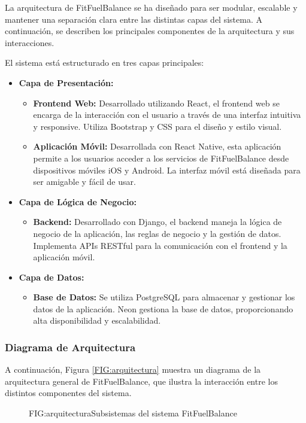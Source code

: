 La arquitectura de FitFuelBalance se ha diseñado para ser modular, escalable y mantener una separación clara entre las distintas capas del sistema. A continuación, se describen los principales componentes de la arquitectura y sus interacciones.

El sistema está estructurado en tres capas principales: 

\begin{itemize}
    \item \textbf{Capa de Presentación:} 
    \begin{itemize}
        \item \textbf{Frontend Web:} Desarrollado utilizando React, el frontend web se encarga de la interacción con el usuario a través de una interfaz intuitiva y responsive. Utiliza Bootstrap y CSS para el diseño y estilo visual.
        \item \textbf{Aplicación Móvil:} Desarrollada con React Native, esta aplicación permite a los usuarios acceder a los servicios de FitFuelBalance desde dispositivos móviles iOS y Android. La interfaz móvil está diseñada para ser amigable y fácil de usar.
    \end{itemize}
    
    \item \textbf{Capa de Lógica de Negocio:} 
    \begin{itemize}
        \item \textbf{Backend:} Desarrollado con Django, el backend maneja la lógica de negocio de la aplicación, las reglas de negocio y la gestión de datos. Implementa APIs RESTful para la comunicación con el frontend y la aplicación móvil.
    \end{itemize}
    
    \item \textbf{Capa de Datos:} 
    \begin{itemize}
        \item \textbf{Base de Datos:} Se utiliza PostgreSQL para almacenar y gestionar los datos de la aplicación. Neon gestiona la base de datos, proporcionando alta disponibilidad y escalabilidad.
    \end{itemize}
    
\end{itemize}

\subsubsection{Diagrama de Arquitectura}
    A continuación, Figura \ref{FIG:arquitectura} muestra un diagrama de la arquitectura general de FitFuelBalance, que ilustra la interacción entre los distintos componentes del sistema.
    \begin{figure}[Distribución Arquitectura]{FIG:arquitectura}{Subsistemas del sistema FitFuelBalance}
    \end{figure}

